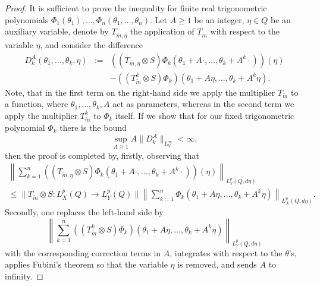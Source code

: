\documentclass[11pt,a4paper,twoside,draft]{amsart}
\theoremstyle{definition}
\begin{document}
\begin{proof} 
It is sufficient to prove the inequality for finite real trigonometric 
polynomials 
$\Phi_1(\theta_1),...,\Phi_n(\theta_1,...,\theta_n)$.
Let $A\geq 1$ be an integer, $\eta\in Q$ be an auxiliary variable, denote 
by $T_{{\widetilde m},\eta}$ the application of $T_{\widetilde m}$ with respect to the 
variable $\eta$, and consider the difference
\begin{eqnarray*}
      D_k^A(\theta_1,...,\theta_k,\eta)
&:= & ((T_{{\widetilde m},\eta} \otimes S) \Phi_k(\theta_1+A\cdot,\ldots ,\theta_k+A^k\cdot))
      (\eta) \\
&   & -  ((T_{\widetilde m}^k \otimes S) \Phi_k) 
      (\theta_1+A\eta,\ldots ,\theta_k+A^k\eta ).
\end{eqnarray*}
Note, that in the first term on the right-hand side we apply the multiplier 
$T_{\widetilde m}$ to a function, where
$\theta_1,...,\theta_k,A$ act as parameters, whereas in the second term 
we apply the multiplier $T_{\widetilde m}^k$ to $\Phi_k$ itself.
If we show that for our fixed trigonometric polynomial $\Phi_k$ there is the bound
\begin{equation}\label{eq:3.40}
\sup_{A\ge 1} A \| D_k^A\|_{L_Y^\infty}  < \infty,
\end{equation}
then the proof is completed by, firstly, observing  that  
\begin{multline*}
    \left \| \sum_{k=1}^n 
    ((T_{{\widetilde m},\eta} \otimes S) \Phi_k(\theta_1+A\cdot,\ldots ,\theta_k+A^k\cdot))
    (\eta) 
    \right\|_{L_Y^p(Q,d\eta)} \\
\le \| T_{\widetilde m}\otimes S: {L^p_X(Q)\to L^p_Y(Q)}\| 
     \left \| \sum_{k=1}^n 
     \Phi_k (\theta_1+A\eta,\ldots ,\theta_k+A^k\eta )
     \right\|_{L_X^p(Q,d\eta)}.
\end{multline*}
Secondly, one replaces  the left-hand side by
\[ \left \| \sum_{k=1}^n 
   ((T_{\widetilde m}^k \otimes S) \Phi_k) (\theta_1+A\eta,\ldots ,\theta_k+A^k \eta )
   \right\|_{L_Y^p(Q,d\eta)} \]
with the corresponding correction terms in $A$,
integrates with respect to the $\theta$'s, 
applies Fubini's theorem so that the variable  $\eta$ is removed, and 
sends $A$ to infinity.


\end{proof}
\end{document}
